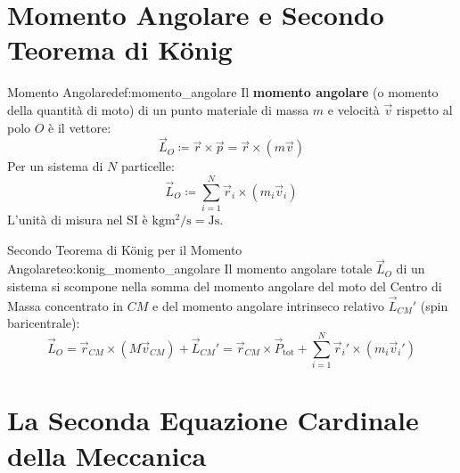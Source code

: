 \section{Momento Angolare e Secondo Teorema di König}
\label{sec:momento_angolare}

\begin{definizione}{Momento Angolare}{def:momento_angolare}
Il \textbf{momento angolare} (o momento della quantità di moto) di un punto materiale di massa $m$ e velocità $\vec{v}$ rispetto al polo $O$ è il vettore:
\begin{equation}
    \vec{L}_O \coloneqq \vec{r} \times \vec{p} = \vec{r} \times (m\vec{v})
    \label{eq:momento_angolare_punto}
\end{equation}
Per un sistema di $N$ particelle:
\begin{equation}
    \vec{L}_O \coloneqq \sum_{i=1}^N \vec{r}_i \times (m_i\vec{v}_i)
    \label{eq:momento_angolare_sistema}
\end{equation}
L'unità di misura nel SI è $\si{\kilogram\metre\squared\per\second} = \si{\joule\second}$.
\end{definizione}

\begin{teorema}{Secondo Teorema di König per il Momento Angolare}{teo:konig_momento_angolare}
Il momento angolare totale $\vec{L}_O$ di un sistema si scompone nella somma del momento angolare del moto del Centro di Massa concentrato in $CM$ e del momento angolare intrinseco relativo $\vec{L}_{CM}'$ (spin baricentrale):
\begin{equation}
    \vec{L}_O = \vec{r}_{CM} \times (M\vec{v}_{CM}) + \vec{L}_{CM}' = \vec{r}_{CM} \times \vec{P}_{\text{tot}} + \sum_{i=1}^N \vec{r}_i' \times (m_i\vec{v}_i')
    \label{eq:konig_L}
\end{equation}
\end{teorema}

\section{La Seconda Equazione Cardinale della Meccanica}
\label{sec:seconda_cardinale}

